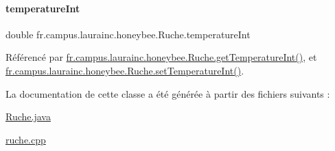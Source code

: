 \mbox{\label{classfr_1_1campus_1_1laurainc_1_1honeybee_1_1_ruche_aa8c8bbb640a5e445ca1d67f97e0f99b0}} 
\paragraph{\texorpdfstring{temperature\+Int}{temperatureInt}}
{\footnotesize\ttfamily double fr.\+campus.\+laurainc.\+honeybee.\+Ruche.\+temperature\+Int\hspace{0.3cm}{\ttfamily [private]}}



Référencé par \hyperlink{classfr_1_1campus_1_1laurainc_1_1honeybee_1_1_ruche_aca5e489525d7f0cba7741a0d1803c5e5}{fr.\+campus.\+laurainc.\+honeybee.\+Ruche.\+get\+Temperature\+Int()}, et \hyperlink{classfr_1_1campus_1_1laurainc_1_1honeybee_1_1_ruche_a4bed1041019b54d79beb46d36aae0adb}{fr.\+campus.\+laurainc.\+honeybee.\+Ruche.\+set\+Temperature\+Int()}.



La documentation de cette classe a été générée à partir des fichiers suivants \+:\begin{DoxyCompactItemize}
\item 
\hyperlink{_ruche_8java}{Ruche.\+java}\item 
\hyperlink{ruche_8cpp}{ruche.\+cpp}\end{DoxyCompactItemize}

